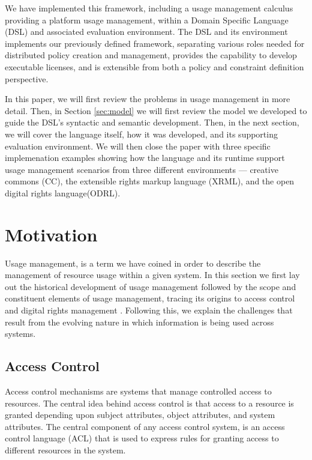 We have implemented this framework, including a usage management calculus providing a platform usage management, within a Domain Specific Language (DSL) and associated evaluation environment. The DSL and its environment implements our previously defined framework, separating various roles needed for distributed policy creation and management, provides the capability to develop executable licenses, and is extensible from both a policy and constraint definition perspective.

In this paper, we will first review the problems in usage management in more detail.  Then, in Section \ref{sec:model} we will first review the model we developed to guide the DSL's syntactic and semantic development.  Then, in the next section, we will cover the language itself, how it was developed, and its supporting evaluation environment.  We will then close the paper with three specific implemenation examples showing how the language and its runtime support usage management scenarios from three different environments --- creative commons (CC), the extensible rights markup language (XRML), and the open digital rights language(ODRL).

\section{Motivation}\label{sec:motivation}
Usage management, is a term we have coined in order to describe the management of resource usage within a given system.  In this section we first lay out the historical development of usage management followed by the scope and constituent elements of usage management, tracing its origins to access control and digital rights management . Following this, we explain the challenges that result from the evolving nature in which information is being used across systems. 

\subsection{Access Control}
Access control mechanisms are systems that manage controlled access to resources. The central idea behind access control is that access to a resource is granted depending upon subject attributes, object attributes, and system attributes. The central component of any access control system, is an access control language (ACL) that is used to express rules for granting access to different resources in the system.

